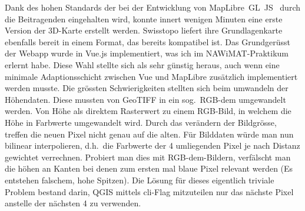 Dank des hohen Standards der bei der Entwicklung von MapLibre~GL~JS~\cite{maplibregljs} durch die Beitragenden eingehalten wird, konnte innert wenigen Minuten eine erste Version der 3D-Karte erstellt werden. Swisstopo liefert ihre Grundlagenkarte ebenfalls bereit in einem Format, das bereits kompatibel ist. Das Grundgerüsst der Webapp wurde in Vue.js implementiert, was ich im NAWiMAT-Praktikum erlernt habe. Diese Wahl stellte sich als sehr günstig heraus, auch wenn eine minimale Adaptionsschicht zwischen Vue und MapLibre zusätzlich implementiert werden musste.
Die grössten Schwierigkeiten stellten sich beim umwandeln der Höhendaten. Diese mussten von GeoTIFF in ein sog.\ RGB-\acrshort{dem} umgewandelt werden. Von Höhe als direktem Rasterwert zu einem RGB-Bild, in welchem die Höhe in Farbwerte umgewandelt wird. Durch das verändern der Bildgrösse, treffen die neuen Pixel nicht genau auf die alten. Für Bilddaten würde man nun bilinear interpolieren, d.h.\ die Farbwerte der 4 umliegenden Pixel je nach Distanz gewichtet verrechnen. Probiert man dies mit RGB-\acrshort{dem}-Bildern, verfälscht man die höhen an Kanten bei denen zum ersten mal blaue Pixel relevant werden (Es entstehen falschem, hohe Spitzen). Die Lösung für dieses eigentlich triviale Problem bestand darin, QGIS mittels \acrshort{cli}-Flag mitzuteilen nur das nächste Pixel anstelle der nächsten 4 zu verwenden.

